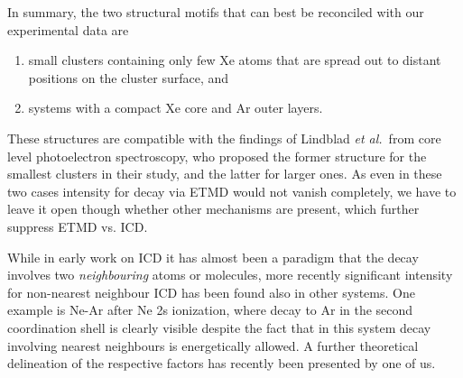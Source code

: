In summary, the two structural motifs that can best be reconciled with our experimental data are
\begin{enumerate}
	\item small clusters containing only few Xe atoms that are spread out to distant positions on the cluster surface, and
	\item systems with a compact Xe core and Ar outer layers.
\end{enumerate}
These structures are compatible with the findings of Lindblad {\it et al.}\ from core level photoelectron spectroscopy, who proposed the former structure for the smallest clusters in their study, and the latter for larger ones.\cite{lindblad}
As even in these two cases intensity for decay via ETMD would not vanish completely, we have to leave it open though whether other mechanisms are present, which further suppress ETMD vs. ICD.

While in early work on ICD it has almost been a paradigm that the decay involves two {\it neighbouring} atoms or molecules,\cite{hergenhahn_review} more recently significant intensity for non-nearest neighbour ICD has been found also in other systems.
One example is Ne-Ar after Ne 2s ionization, where decay to Ar in the second coordination shell is clearly visible despite the fact that in this system decay involving nearest neighbours is energetically allowed.\cite{fasshauer2014}
A further theoretical delineation of the respective factors has recently been presented by one of us.\cite{fasshauernjp}
